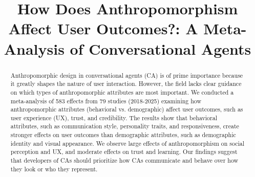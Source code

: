 \documentclass[sigconf,review,anonymous]{acmart}
\begin{document}
\title[The Effects of Anthropomorphism in Conversational Agents]{How Does Anthropomorphism Affect User Outcomes?: A Meta-Analysis of Conversational Agents}


\begin{abstract}

Anthropomorphic design in conversational agents (CA) is of prime importance because it greatly shapes the nature of user interaction. However, the field lacks clear guidance on which types of anthropomorphic attributes are most important. We conducted a meta-analysis of 583 effects from 79 studies (2018-2025) examining how anthropomorphic attributes (behavioral vs. demographic) affect user outcomes, such as user experience (UX), trust, and credibility. The results show that behavioral attributes, such as communication style, personality traits, and responsiveness, create stronger effects on user outcomes than demographic attributes, such as demographic identity and visual appearance. We observe large effects of anthropomorphism on social perception and UX, and moderate effects on trust and learning. Our findings suggest that developers of CAs should prioritize how CAs communicate and behave over how they look or who they represent.

\end{abstract}


\end{document}

